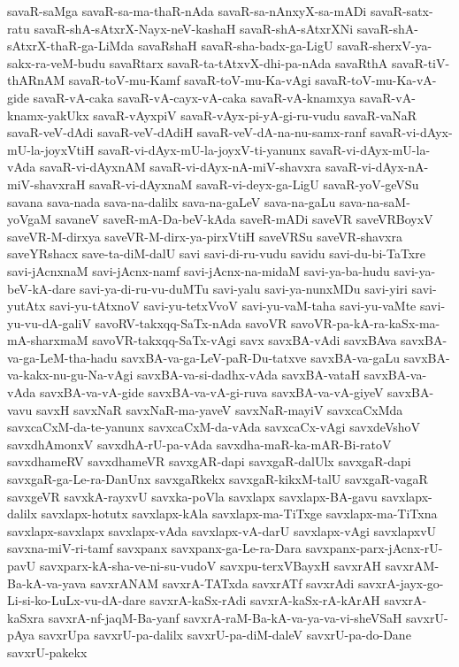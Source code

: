 {savaR-saMga
savaR-sa-ma-thaR-nAda
savaR-sa-nAnxyX-sa-mADi
savaR-satx-ratu
savaR-shA-sAtxrX-Nayx-neV-kashaH
savaR-shA-sAtxrXNi
savaR-shA-sAtxrX-thaR-ga-LiMda
savaRshaH
savaR-sha-badx-ga-LigU
savaR-sherxV-ya-sakx-ra-veM-budu
savaRtarx
savaR-ta-tAtxvX-dhi-pa-nAda
savaRthA
savaR-tiV-thARnAM
savaR-toV-mu-Kamf
savaR-toV-mu-Ka-vAgi
savaR-toV-mu-Ka-vA-gide
savaR-vA-caka
savaR-vA-cayx-vA-caka
savaR-vA-knamxya
savaR-vA-knamx-yakUkx
savaR-vAyxpiV
savaR-vAyx-pi-yA-gi-ru-vudu
savaR-vaNaR
savaR-veV-dAdi
savaR-veV-dAdiH
savaR-veV-dA-na-nu-samx-ranf
savaR-vi-dAyx-mU-la-joyxVtiH
savaR-vi-dAyx-mU-la-joyxV-ti-yanunx
savaR-vi-dAyx-mU-la-vAda
savaR-vi-dAyxnAM
savaR-vi-dAyx-nA-miV-shavxra
savaR-vi-dAyx-nA-miV-shavxraH
savaR-vi-dAyxnaM
savaR-vi-deyx-ga-LigU
savaR-yoV-geVSu
savana
sava-nada
sava-na-dalilx
sava-na-gaLeV
sava-na-gaLu
sava-na-saM-yoVgaM
savaneV
saveR-mA-Da-beV-kAda
saveR-mADi
saveVR
saveVRBoyxV
saveVR-M-dirxya
saveVR-M-dirx-ya-pirxVtiH
saveVRSu
saveVR-shavxra
saveYRshacx
save-ta-diM-dalU
savi
savi-di-ru-vudu
savidu
savi-du-bi-TaTxre
savi-jAcnxnaM
savi-jAcnx-namf
savi-jAcnx-na-midaM
savi-ya-ba-hudu
savi-ya-beV-kA-dare
savi-ya-di-ru-vu-duMTu
savi-yalu
savi-ya-nunxMDu
savi-yiri
savi-yutAtx
savi-yu-tAtxnoV
savi-yu-tetxVvoV
savi-yu-vaM-taha
savi-yu-vaMte
savi-yu-vu-dA-galiV
savoRV-takxqq-SaTx-nAda
savoVR
savoVR-pa-kA-ra-kaSx-ma-mA-sharxmaM
savoVR-takxqq-SaTx-vAgi
savx
savxBA-vAdi
savxBAva
savxBA-va-ga-LeM-tha-hadu
savxBA-va-ga-LeV-paR-Du-tatxve
savxBA-va-gaLu
savxBA-va-kakx-nu-gu-Na-vAgi
savxBA-va-si-dadhx-vAda
savxBA-vataH
savxBA-va-vAda
savxBA-va-vA-gide
savxBA-va-vA-gi-ruva
savxBA-va-vA-giyeV
savxBA-vavu
savxH
savxNaR
savxNaR-ma-yaveV
savxNaR-mayiV
savxcaCxMda
savxcaCxM-da-te-yanunx
savxcaCxM-da-vAda
savxcaCx-vAgi
savxdeVshoV
savxdhAmonxV
savxdhA-rU-pa-vAda
savxdha-maR-ka-mAR-Bi-ratoV
savxdhameRV
savxdhameVR
savxgAR-dapi
savxgaR-dalUlx
savxgaR-dapi
savxgaR-ga-Le-ra-DanUnx
savxgaRkekx
savxgaR-kikxM-talU
savxgaR-vagaR
savxgeVR
savxkA-rayxvU
savxka-poVla
savxlapx
savxlapx-BA-gavu
savxlapx-dalilx
savxlapx-hotutx
savxlapx-kAla
savxlapx-ma-TiTxge
savxlapx-ma-TiTxna
savxlapx-savxlapx
savxlapx-vAda
savxlapx-vA-darU
savxlapx-vAgi
savxlapxvU
savxna-miV-ri-tamf
savxpanx
savxpanx-ga-Le-ra-Dara
savxpanx-parx-jAcnx-rU-pavU
savxparx-kA-sha-ve-ni-su-vudoV
savxpu-terxVBayxH
savxrAH
savxrAM-Ba-kA-va-yava
savxrANAM
savxrA-TATxda
savxrATf
savxrAdi
savxrA-jayx-go-Li-si-ko-LuLx-vu-dA-dare
savxrA-kaSx-rAdi
savxrA-kaSx-rA-kArAH
savxrA-kaSxra
savxrA-nf-jaqM-Ba-yanf
savxrA-raM-Ba-kA-va-ya-va-vi-sheVSaH
savxrU-pAya
savxrUpa
savxrU-pa-dalilx
savxrU-pa-diM-daleV
savxrU-pa-do-Dane
savxrU-pakekx
}
